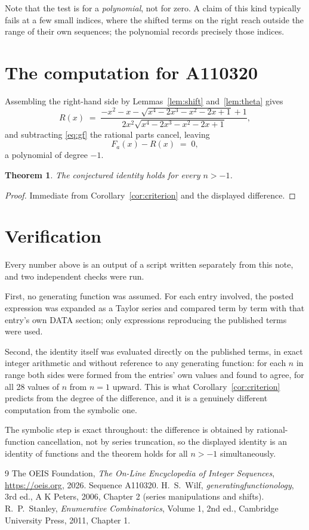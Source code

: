 \documentclass[11pt,a4paper]{article}
\theoremstyle{plain}
\newtheorem{theorem}{Theorem}
\theoremstyle{definition}
\begin{document}
Note that the test is for a \emph{polynomial}, not for zero. A claim of this kind
typically fails at a few small indices, where the shifted terms on the right reach outside
the range of their own sequences; the polynomial records precisely those indices.

\section{The computation for A110320}

Assembling the right-hand side by Lemmas~\ref{lem:shift} and~\ref{lem:theta} gives
\[
R(x)\;=\;\frac{- x^{2} - x - \sqrt{x^{4} - 2 x^{3} - x^{2} - 2 x + 1} + 1}{2 x^{2} \sqrt{x^{4} - 2 x^{3} - x^{2} - 2 x + 1}} ,
\]
and subtracting \eqref{eq:gf} the rational parts cancel, leaving
\[
F_{a}(x)-R(x)\;=\;0 ,
\]
a polynomial of degree $-1$.

\begin{theorem}
The conjectured identity holds for every $n>-1$.
\end{theorem}

\begin{proof}
Immediate from Corollary~\ref{cor:criterion} and the displayed difference.
\end{proof}

\section{Verification}

Every number above is an output of a script written separately from this note, and two
independent checks were run.

First, no generating function was assumed. For each entry involved, the posted expression
was expanded as a Taylor series and compared term by term with that entry's own DATA
section; only expressions reproducing the published terms were used.

Second, the identity itself was evaluated directly on the published terms, in exact
integer arithmetic and without reference to any generating function: for each $n$ in range
both sides were formed from the entries' own values and found to agree, for all 28
values of $n$ from $n=1$ upward. This is what Corollary~\ref{cor:criterion}
predicts from the degree of the difference, and it is a genuinely different computation
from the symbolic one.

The symbolic step is exact throughout: the difference is obtained by rational-function
cancellation, not by series truncation, so the displayed identity is an identity of
functions and the theorem holds for all $n>-1$ simultaneously.

\begin{thebibliography}{9}
 The OEIS Foundation, \emph{The On-Line Encyclopedia of Integer Sequences},
\url{https://oeis.org}, 2026. Sequence A110320.
 H.~S.~Wilf, \emph{generatingfunctionology}, 3rd ed., A K Peters, 2006,
Chapter 2 (series manipulations and shifts).
 R.~P.~Stanley, \emph{Enumerative Combinatorics}, Volume 1, 2nd ed.,
Cambridge University Press, 2011, Chapter 1.
\end{thebibliography}
\end{document}

